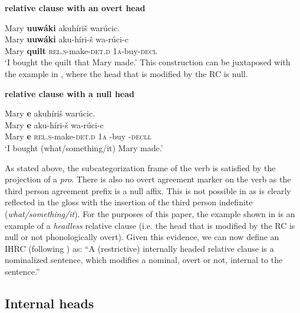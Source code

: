 \documentclass[output=paper]{LSP/langsci}
\begin{document}
\ea \textbf{ relative clause with an overt head} \label{boyle9}

\glll Mary \textbf{uuwáki} akuh\'iri\v{s} war\'ucic.\\
Mary \textbf{uuwáki} aku-h\'iri-\v{s}      wa-r\'uci-c\\
Mary \textbf{quilt} \textsc{rel.s}-make-\textsc{det.d} \textsc{1a}-buy-\textsc{decl} \\
\trans `I bought the quilt that Mary made.' 	
\z
This construction can be juxtaposed with the example in , where the head that is modified by the RC is null.

\ea \textbf{ relative clause with a null head} \label{boyle10}

\glll Mary \textbf{e} akuh\'iri\v{s} war\'ucic.\\
Mary \textbf{e} aku-h\'iri-\v{s}   wa-r\'uci-c\\
Mary \textbf{e} \textsc{rel.s}-make-\textsc{det.d} \textsc{1a} -buy -\textsc{decll}\\ 
\trans `I bought (what/something/it) Mary made.'
\z

As stated above, the subcategorization frame of the verb is satisfied by the projection of a \textit{pro}. There is also no overt agreement marker on the verb as the third person agreement prefix is a null affix. This is not possible in  as is clearly reflected in the gloss with the insertion of the  third person indefinite (\textit{what/something/it}). For the purposes of this paper, the example shown in  is an example of a \textit{headless} relative clause (i.e. the head that is modified by the RC is null or not phonologically overt). Given this evidence, we can now define an IHRC (following \citealt[27]{Culy1990}) as: ``A (restrictive) internally headed relative clause is a nominalized sentence, which modifies a nominal, overt or not, internal to the sentence.'' 

\subsection{Internal heads}\label{sec:boyle:3.1}
\end{document}

